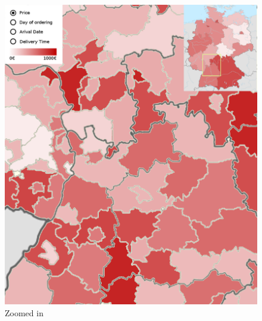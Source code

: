 \documentclass[a4paper]{article}
\begin{document}
\begin{figure}[!ht]
	\centering
	\includegraphics[width=0.7\linewidth]{germany-2c2}
	\caption{Zoomed in}
	\label{fig:germany-2c2}
\end{figure}
\end{document}
